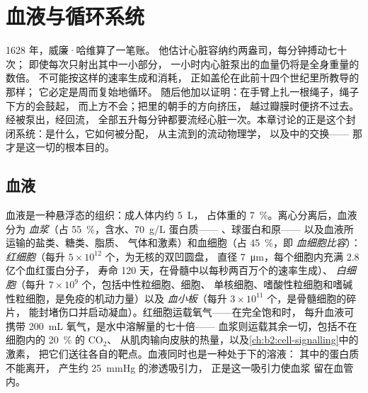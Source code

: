 \chapter{血液与循环系统}\label{ch:b2:blood-circulation}

1628 年，威廉·哈维算了一笔账。
他估计心脏容纳约两盎司，每分钟搏动七十次；
即使每次只射出其中一小部分，
一小时内心脏泵出的血量仍将是全身重量的数倍。
不可能按这样的速率生成和消耗，
正如盖伦在此前十四个世纪里所教导的那样；
它必定是周而复始地循环。
随后他加以证明：在手臂上扎一根绳子，绳子下方的会鼓起，
而上方不会；把里的朝手的方向挤压，
越过瓣膜时便挤不过去。经被泵出，经回流，
全部五升每分钟都要流经心脏一次。本章讨论的正是这个封闭系统：是什么，它如何被分配，
从主流到的流动物理学，
以及中的交换——
那才是这一切的根本目的。

\section{血液}

\begin{definition}[血液的组成]\label{def:b2:blood-circulation:blood}
血液是一种悬浮态的组织：成人体内约 \qty{5}{L}，
占体重的 \qty{7}{\%}。离心分离后，血液分为
\emph{血浆}（占 \qty{55}{\%}，含水、\qty{70}{g/L} 蛋白质——
、球蛋白和原——
以及血液所运输的盐类、糖类、脂质、
气体和激素）和血细胞（占 \qty{45}{\%}，即
\emph{血细胞比容}）：
\emph{红细胞}（每升 $5\times 10^{12}$ 个，为无核的双凹圆盘，
直径 \qty{7}{\micro m}，每个细胞内充满 2.8 亿个血红蛋白分子，
寿命 120 天，在骨髓中以每秒两百万个的速率生成）、
\emph{白细胞}（每升 $7\times 10^{9}$ 个，包括中性粒细胞、细胞、
单核细胞、嗜酸性粒细胞和嗜碱性粒细胞，是免疫的机动力量）以及
\emph{血小板}（每升 $3\times 10^{11}$ 个，是骨髓细胞的碎片，
能封堵伤口并启动凝血）。红细胞运载氧气——在完全饱和时，
每升血液可携带 \qty{200}{mL} 氧气，是水中溶解量的七十倍——
血浆则运载其余一切，包括不在细胞内的 \qty{20}{\%} 的 $\mathrm{CO_2}$、
从肌肉输向皮肤的热量，以及\cref{ch:b2:cell-signalling}中的激素，
把它们送往各自的靶点。血液同时也是一种处于\emph{}下的溶液：
其中的蛋白质不能离开，
产生约 \qty{25}{mmHg} 的渗透吸引力，
正是这一吸引力使血浆
留在血管内。
\end{definition}

